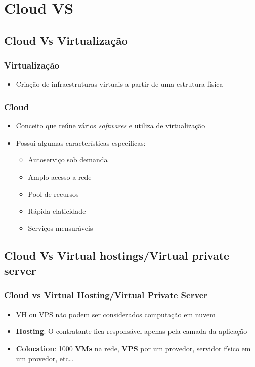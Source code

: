 \section{Cloud VS}

\subsection{Cloud Vs Virtualização}

\begin{frame}
	\frametitle{Virtualização}
	\begin{itemize}
		\item Criação de infraestruturas virtuais a partir de uma estrutura física
	\end{itemize}
\end{frame}

\begin{frame}
	\frametitle{Cloud}
	\begin{itemize}
		\item Conceito que reúne vários \textit{softwares} e utiliza de virtualização
		\item Possui algumas características específicas:
			\begin{itemize}
				\item Autoserviço sob demanda
				\item Amplo acesso a rede
				\item Pool de recursos
				\item Rápida elaticidade
				\item Serviços mensuráveis
			\end{itemize}
	\end{itemize}
\end{frame}

\subsection{Cloud Vs Virtual hostings/Virtual private server}

\begin{frame}
	\frametitle{Cloud vs Virtual Hosting/Virtual Private Server}
	\begin{itemize}
		\item VH ou VPS não podem ser considerados computação em nuvem
		\item \textbf{Hosting}: O contratante fica responsável apenas pela camada da aplicação
		\item \textbf{Colocation}: 1000 \textbf{VMs} na rede, \textbf{VPS} por um provedor, servidor físico em um provedor, etc\dots
	\end{itemize}
\end{frame}


